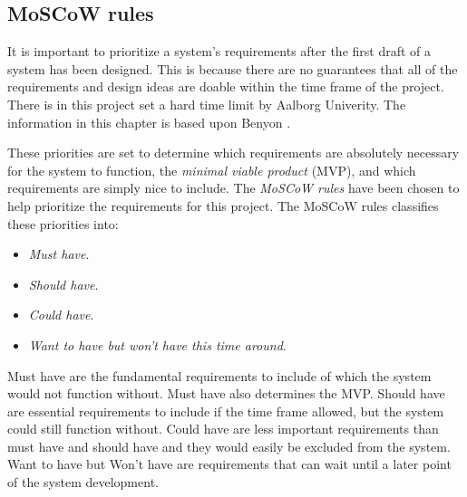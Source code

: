 \subsection{MoSCoW rules}\label{sec:requirements}

It is important to prioritize a system's requirements after the first draft of a system has been designed.
This is because there are no guarantees that all of the requirements and design ideas are doable within the time frame of the project.
There is in this project set a hard time limit by Aalborg Univerity.
The information in this chapter is based upon Benyon \cite{Benyon}.

These priorities are set to determine which requirements are absolutely necessary for the system to function, the \textit{minimal viable product} (MVP),
and which requirements are simply nice to include.
The \textit{MoSCoW rules}
have been chosen to help prioritize the requirements for this project.
The MoSCoW rules classifies these priorities into:

\begin{itemize}
    \item \textit{Must have}.
    \item \textit{Should have}.
    \item \textit{Could have}.
    \item \textit{Want to have but won’t have this time around}.
\end{itemize}

Must have are the fundamental requirements to include of which the system would not function without.
Must have also determines the MVP.
Should have are essential requirements to include if the time frame allowed, but the system could still function without.
Could have are less important requirements than must have and should have and they would easily be excluded from the system.
Want to have but Won't have are requirements that can wait until a later point of the system development.

